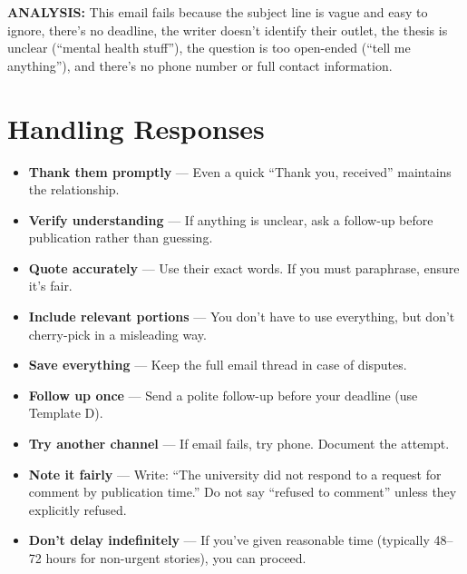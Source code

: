 \documentclass[12pt]{article}
\newcommand{\key}[1]{\textbf{#1}}
\begin{document}
\textbf{ANALYSIS:} This email fails because the subject line is vague and easy to ignore, there's no deadline, the writer doesn't identify their outlet, the thesis is unclear (``mental health stuff''), the question is too open-ended (``tell me anything''), and there's no phone number or full contact information.

\section{Handling Responses}

\begin{exampleblock}
\begin{itemize}
  \item \key{Thank them promptly} --- Even a quick ``Thank you, received'' maintains the relationship.
  \item \key{Verify understanding} --- If anything is unclear, ask a follow-up before publication rather than guessing.
  \item \key{Quote accurately} --- Use their exact words. If you must paraphrase, ensure it's fair.
  \item \key{Include relevant portions} --- You don't have to use everything, but don't cherry-pick in a misleading way.
  \item \key{Save everything} --- Keep the full email thread in case of disputes.
\end{itemize}
\end{exampleblock}

\begin{exampleblock}
\begin{itemize}
  \item \key{Follow up once} --- Send a polite follow-up before your deadline (use Template D).
  \item \key{Try another channel} --- If email fails, try phone. Document the attempt.
  \item \key{Note it fairly} --- Write: ``The university did not respond to a request for comment by publication time.'' Do not say ``refused to comment'' unless they explicitly refused.
  \item \key{Don't delay indefinitely} --- If you've given reasonable time (typically 48--72 hours for non-urgent stories), you can proceed.
\end{itemize}
\end{exampleblock}
\end{document}
